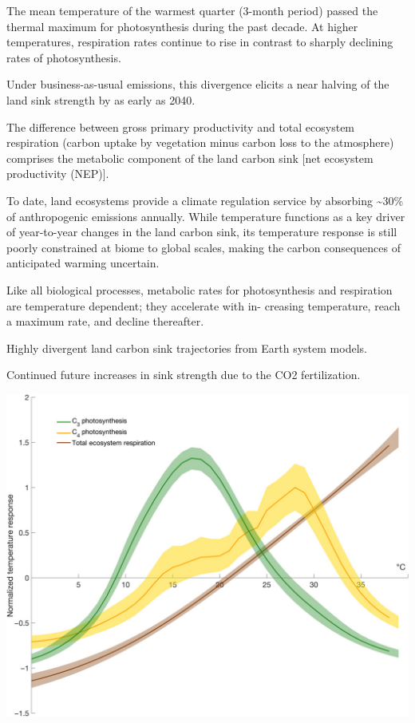 \documentclass[
]{book}
\begin{document}
The mean temperature of the warmest quarter (3-month period)
passed the thermal maximum for photosynthesis during the past decade.
At higher temperatures, respiration rates continue to rise
in contrast to sharply declining rates of photosynthesis.

Under business-as-usual emissions, this divergence elicits a
near halving of the land sink strength by as early as 2040.

The difference between gross primary productivity
and total ecosystem respiration
(carbon uptake by vegetation minus carbon loss to the atmosphere)
comprises the metabolic component of the land carbon
sink {[}net ecosystem productivity (NEP){]}.

To date, land ecosystems provide a climate regulation service
by absorbing \textasciitilde30\% of anthropogenic emissions annually.
While temperature functions as a key driver
of year-to-year changes in the land carbon sink,
its temperature response is still poorly constrained at biome to global scales,
making the carbon consequences of anticipated warming uncertain.

Like all biological processes, metabolic rates for photosynthesis
and respiration are temperature dependent; they accelerate with in-
creasing temperature, reach a maximum rate, and decline thereafter.

Highly divergent land carbon sink trajectories from Earth system models.

Continued future increases in sink strength due to the CO2 fertilization.

\includegraphics{fig/Photosythesis_Temp_Response.jpg}
\end{document}

